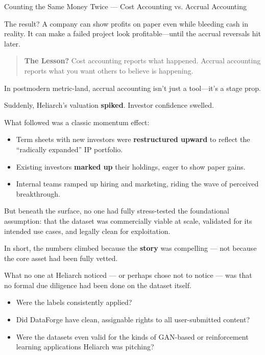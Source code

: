 \begin{HistoricalSidebar}{Counting the Same Money Twice — Cost Accounting vs. Accrual Accounting}
\medskip

The result?  
A company can show profits on paper even while bleeding cash in reality.  
It can make a failed project look profitable—until the accrual reversals hit later.

\begin{quote}
\textbf{The Lesson?} Cost accounting reports what happened. Accrual accounting reports what you want others to believe is happening.
\end{quote}

In postmodern metric-land, accrual accounting isn’t just a tool—it’s a stage prop.

\end{HistoricalSidebar}

\medskip

Suddenly, Heliarch’s valuation \textbf{spiked}. Investor confidence swelled.

What followed was a classic momentum effect:

\begin{itemize}
    \item Term sheets with new investors were \textbf{restructured upward} to reflect the “radically expanded” IP portfolio.
    \item Existing investors \textbf{marked up} their holdings, eager to show paper gains.
    \item Internal teams ramped up hiring and marketing, riding the wave of perceived breakthrough.
\end{itemize}

But beneath the surface, no one had fully stress-tested the foundational assumption: that the dataset was commercially viable at scale, validated for its intended use cases, and legally clean for exploitation.

In short, the numbers climbed because the \textbf{story} was compelling — not because the core asset had been fully vetted.

What no one at Heliarch noticed --- or perhaps chose not to notice --- was that no formal due diligence had been done on the dataset itself.

\begin{itemize}
    \item Were the labels consistently applied?

    \item Did DataForge have clean, assignable rights to all user-submitted content?

    \item Were the datasets even valid for the kinds of GAN-based or reinforcement learning applications Heliarch was pitching?
\end{itemize}

